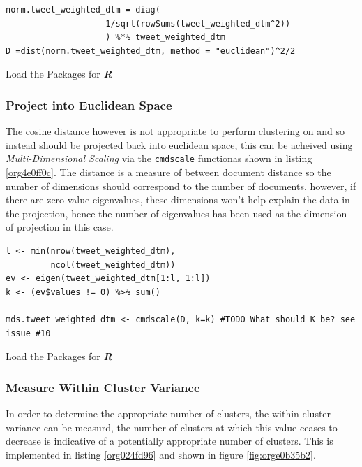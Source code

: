 \documentclass[11pt]{article}
\begin{document}
\begin{listing}[htbp]
\begin{verbatim}
norm.tweet_weighted_dtm = diag(
                    1/sqrt(rowSums(tweet_weighted_dtm^2))
                    ) %*% tweet_weighted_dtm
D =dist(norm.tweet_weighted_dtm, method = "euclidean")^2/2
\end{verbatim}
\caption{\label{orgaeead00}Load the Packages for \textbf{\textbf{\emph{R}}}}
\end{listing}

\subsubsection{Project into Euclidean Space}
\label{sec:orgf29d5d6}
The cosine distance however is not appropriate to perform clustering on and so instead should be projected back into euclidean space, this can be acheived using \emph{Multi-Dimensional Scaling} via the \texttt{cmdscale} functionas shown in listing \ref{org4e0ff0c}. The distance is a measure of between document distance so the number of dimensions should correspond to the number of documents, however, if there are zero-value eigenvalues, these dimensions won't help explain the data in the projection, hence the number of eigenvalues has been used as the dimension of projection in this case.

\begin{listing}[htbp]
\begin{verbatim}
l <- min(nrow(tweet_weighted_dtm),
         ncol(tweet_weighted_dtm))
ev <- eigen(tweet_weighted_dtm[1:l, 1:l])
k <- (ev$values != 0) %>% sum()

mds.tweet_weighted_dtm <- cmdscale(D, k=k) #TODO What should K be? see issue #10
\end{verbatim}
\caption{\label{org4e0ff0c}Load the Packages for \textbf{\textbf{\emph{R}}}}
\end{listing}

\subsubsection{Measure Within Cluster Variance}
\label{sec:org59b41af}
In order to determine the appropriate number of clusters, the within cluster
variance can be measurd, the number of clusters at which this value ceases to
decrease is indicative of a potentially appropriate number of clusters. This is
implemented in listing \ref{org024fd96} and shown in figure \ref{fig:orge0b35b2}.
\end{document}

